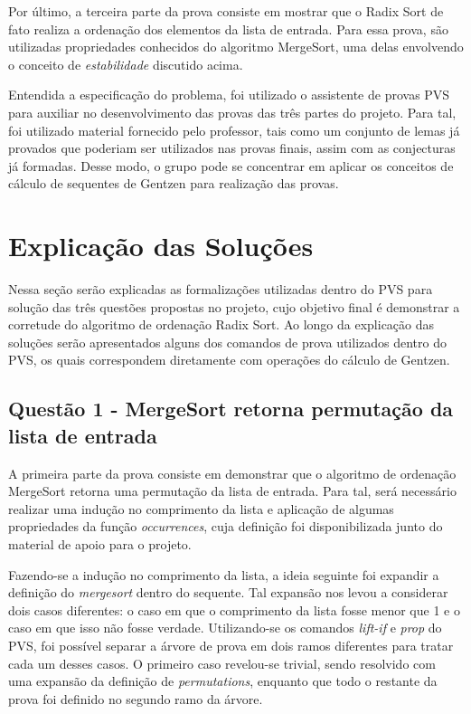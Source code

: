 \documentclass[12pt]{article}
\begin{document}
Por último, a terceira parte da prova consiste em mostrar que o Radix Sort de fato realiza a ordenação dos elementos da lista de entrada. Para essa prova, são utilizadas propriedades conhecidos do algoritmo MergeSort, uma delas envolvendo o conceito de \textit{estabilidade} discutido acima.

Entendida a especificação do problema, foi utilizado o assistente de provas PVS para auxiliar no desenvolvimento das provas das três partes do projeto. Para tal, foi utilizado material fornecido pelo professor, tais como um conjunto de lemas já provados que poderiam ser utilizados nas provas finais, assim com as conjecturas já formadas. Desse modo, o grupo pode se concentrar em aplicar os conceitos de cálculo de sequentes de Gentzen para realização das provas.

\section{Explicação das Soluções}
Nessa seção serão explicadas as formalizações utilizadas dentro do PVS para solução das três questões propostas no projeto, cujo objetivo final é demonstrar a corretude do algoritmo de ordenação Radix Sort. Ao longo da explicação das soluções serão apresentados alguns dos comandos de prova utilizados dentro do PVS, os quais correspondem diretamente com operações do cálculo de Gentzen.

\subsection{Questão 1 - MergeSort retorna permutação da lista de entrada}
A primeira parte da prova consiste em demonstrar que o algoritmo de ordenação MergeSort retorna uma permutação da lista de entrada. Para tal, será necessário realizar uma indução no comprimento da lista e aplicação de algumas propriedades da função \textit{occurrences}, cuja definição foi disponibilizada junto do material de apoio para o projeto.

Fazendo-se a indução no comprimento da lista, a ideia seguinte foi expandir a definição do \textit{mergesort} dentro do sequente. Tal expansão nos levou a considerar dois casos diferentes: o caso em que o comprimento da lista fosse menor que 1 e o caso em que isso não fosse verdade. Utilizando-se os comandos \textit{lift-if} e \textit{prop} do PVS, foi possível separar a árvore de prova em dois ramos diferentes para tratar cada um desses casos. O primeiro caso revelou-se trivial, sendo resolvido com uma expansão da definição de \textit{permutations}, enquanto que todo o restante da prova foi definido no segundo ramo da árvore.
\end{document}
